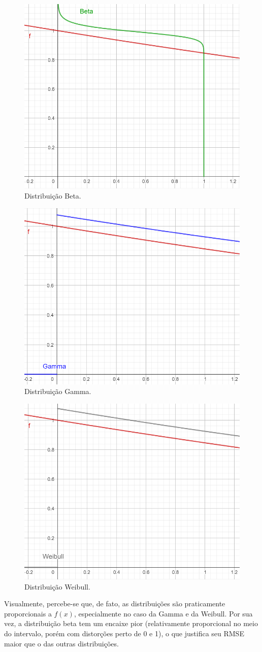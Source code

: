 \documentclass{article}
\begin{document}
\begin{figure}[h]
\centering
\includegraphics[width=0.60\linewidth]{Beta.png}
\caption{\label{fig:Figura 4}Distribuição Beta.}
\end{figure}
\begin{figure}[h]
\centering
\includegraphics[width=0.60\linewidth]{Gamma.png}
\caption{\label{fig:Figura 4}Distribuição Gamma.}
\end{figure}
\begin{figure}[h]
\centering
\includegraphics[width=0.60\linewidth]{Weibull.png}
\caption{\label{fig:Figura 4}Distribuição Weibull.}
\end{figure}

Visualmente, percebe-se que, de fato, as distribuições são praticamente proporcionais a $f(x)$, especialmente no caso da Gamma e da Weibull. Por sua vez, a distribuição beta tem um encaixe pior (relativamente proporcional no meio do intervalo, porém com distorções perto de 0 e 1), o que justifica seu RMSE maior que o das outras distribuições.
\end{document}
